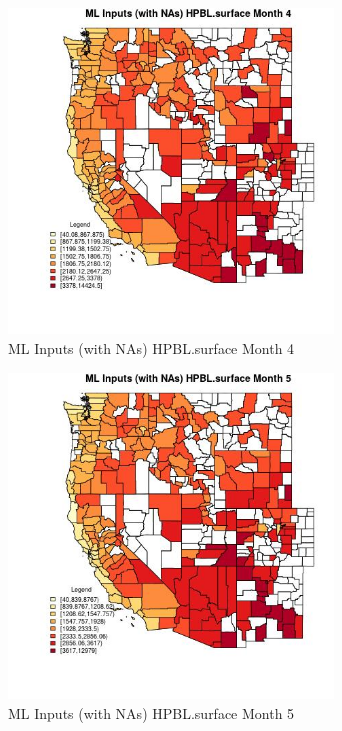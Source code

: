 \begin{figure} 
\centering  
\includegraphics[width=0.77\textwidth]{Code_Outputs/Report_ML_input_PM25_Step4_part_f_de_duplicated_aveswNAs_CountyHPBLsurfacemedianMonth4.jpg} 
\caption{\label{fig:Report_ML_input_PM25_Step4_part_f_de_duplicated_aveswNAsCountyHPBLsurfacemedianMonth4}ML Inputs (with NAs) HPBL.surface Month 4} 
\end{figure} 
 

\begin{figure} 
\centering  
\includegraphics[width=0.77\textwidth]{Code_Outputs/Report_ML_input_PM25_Step4_part_f_de_duplicated_aveswNAs_CountyHPBLsurfacemedianMonth5.jpg} 
\caption{\label{fig:Report_ML_input_PM25_Step4_part_f_de_duplicated_aveswNAsCountyHPBLsurfacemedianMonth5}ML Inputs (with NAs) HPBL.surface Month 5} 
\end{figure} 
 


